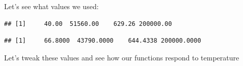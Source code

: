 \documentclass[]{article}
\newenvironment{Shaded}{\begin{snugshade}}{\end{snugshade}}
\newcommand{\KeywordTok}[1]{\textcolor[rgb]{0.13,0.29,0.53}{\textbf{#1}}}
\newcommand{\NormalTok}[1]{#1}
\newcommand{\OperatorTok}[1]{\textcolor[rgb]{0.81,0.36,0.00}{\textbf{#1}}}
\begin{document}
Let's see what values we used:

\begin{Shaded}
\end{Shaded}

\begin{verbatim}
## [1]     40.00  51560.00    629.26 200000.00
\end{verbatim}

\begin{Shaded}
\end{Shaded}

\begin{verbatim}
## [1]     66.8000  43790.0000    644.4338 200000.0000
\end{verbatim}

Let's tweak these values and see how our functions respond to
temperature
\end{document}

